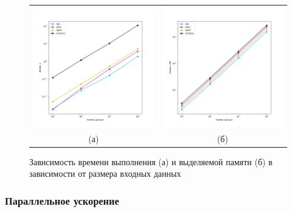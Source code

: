 \documentclass[12pt, a4paper]{article}
\begin{document}
\begin{figure}[H]
	\center
	\begin{tabular}{cc}
		\includegraphics[width=85mm]{singlethread_time} & \includegraphics[width=85mm]{singlethread_memory} \\
		(а) & (б) \\[6pt]
	\end{tabular}
	\caption{Зависимость времени выполнения (а) и выделяемой памяти (б) в зависимости от размера входных данных}
	\label{fig:singlethread_time_memory}
\end{figure}

\subsubsection{Параллельное ускорение}
\end{document}
